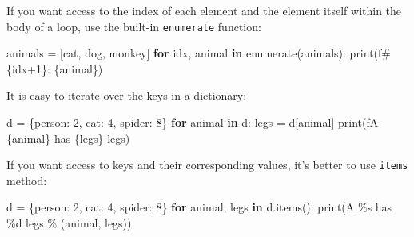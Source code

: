 \documentclass[
]{article}
\newenvironment{Shaded}{}{}
\newcommand{\BuiltInTok}[1]{#1}
\newcommand{\ControlFlowTok}[1]{\textcolor[rgb]{0.00,0.44,0.13}{\textbf{#1}}}
\newcommand{\DecValTok}[1]{\textcolor[rgb]{0.25,0.63,0.44}{#1}}
\newcommand{\KeywordTok}[1]{\textcolor[rgb]{0.00,0.44,0.13}{\textbf{#1}}}
\newcommand{\NormalTok}[1]{#1}
\newcommand{\OperatorTok}[1]{\textcolor[rgb]{0.40,0.40,0.40}{#1}}
\newcommand{\SpecialCharTok}[1]{\textcolor[rgb]{0.25,0.44,0.63}{#1}}
\newcommand{\SpecialStringTok}[1]{\textcolor[rgb]{0.73,0.40,0.53}{#1}}
\newcommand{\StringTok}[1]{\textcolor[rgb]{0.25,0.44,0.63}{#1}}
\begin{document}
If you want access to the index of each element and the element itself
within the body of a loop, use the built-in \texttt{enumerate} function:

\begin{Shaded}
\begin{Highlighting}[]
\NormalTok{animals }\OperatorTok{=}\NormalTok{ [}\StringTok{\textquotesingle{}cat\textquotesingle{}}\NormalTok{, }\StringTok{\textquotesingle{}dog\textquotesingle{}}\NormalTok{, }\StringTok{\textquotesingle{}monkey\textquotesingle{}}\NormalTok{]}
\ControlFlowTok{for}\NormalTok{ idx, animal }\KeywordTok{in} \BuiltInTok{enumerate}\NormalTok{(animals):}
    \BuiltInTok{print}\NormalTok{(}\SpecialStringTok{f\textquotesingle{}\#}\SpecialCharTok{\{}\NormalTok{idx}\OperatorTok{+}\DecValTok{1}\SpecialCharTok{\}}\SpecialStringTok{: }\SpecialCharTok{\{}\NormalTok{animal}\SpecialCharTok{\}}\SpecialStringTok{\textquotesingle{}}\NormalTok{)}
\end{Highlighting}
\end{Shaded}

It is easy to iterate over the keys in a dictionary:

\begin{Shaded}
\begin{Highlighting}[]
\NormalTok{d }\OperatorTok{=}\NormalTok{ \{}\StringTok{\textquotesingle{}person\textquotesingle{}}\NormalTok{: }\DecValTok{2}\NormalTok{, }\StringTok{\textquotesingle{}cat\textquotesingle{}}\NormalTok{: }\DecValTok{4}\NormalTok{, }\StringTok{\textquotesingle{}spider\textquotesingle{}}\NormalTok{: }\DecValTok{8}\NormalTok{\}}
\ControlFlowTok{for}\NormalTok{ animal }\KeywordTok{in}\NormalTok{ d:}
\NormalTok{    legs }\OperatorTok{=}\NormalTok{ d[animal]}
    \BuiltInTok{print}\NormalTok{(}\SpecialStringTok{f\textquotesingle{}A }\SpecialCharTok{\{}\NormalTok{animal}\SpecialCharTok{\}}\SpecialStringTok{ has }\SpecialCharTok{\{}\NormalTok{legs}\SpecialCharTok{\}}\SpecialStringTok{ legs\textquotesingle{}}\NormalTok{)}
\end{Highlighting}
\end{Shaded}

If you want access to keys and their corresponding values, it's better
to use \texttt{items} method:

\begin{Shaded}
\begin{Highlighting}[]
\NormalTok{d }\OperatorTok{=}\NormalTok{ \{}\StringTok{\textquotesingle{}person\textquotesingle{}}\NormalTok{: }\DecValTok{2}\NormalTok{, }\StringTok{\textquotesingle{}cat\textquotesingle{}}\NormalTok{: }\DecValTok{4}\NormalTok{, }\StringTok{\textquotesingle{}spider\textquotesingle{}}\NormalTok{: }\DecValTok{8}\NormalTok{\}}
\ControlFlowTok{for}\NormalTok{ animal, legs }\KeywordTok{in}\NormalTok{ d.items():}
    \BuiltInTok{print}\NormalTok{(}\StringTok{\textquotesingle{}A }\SpecialCharTok{\%s}\StringTok{ has }\SpecialCharTok{\%d}\StringTok{ legs\textquotesingle{}} \OperatorTok{\%}\NormalTok{ (animal, legs))}
\end{Highlighting}
\end{Shaded}
\end{document}
